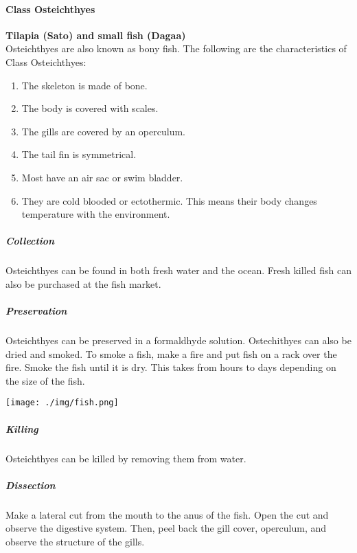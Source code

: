 \begin{multicols}{2}
\paragraph{Class Osteichthyes}

\textbf{Tilapia (Sato) and small fish (Dagaa)}\\
Osteichthyes are also known as bony fish. The following are the characteristics of Class Osteichthyes:
\begin{enumerate}
\item{The skeleton is made of bone.}
\item{The body is covered with scales.}
\item{The gills are covered by an operculum.}
\item{The tail fin is symmetrical.}
\item{Most have an air sac or swim bladder.}
\item{They are cold blooded or ectothermic. This means their body changes temperature with the environment.}
\end{enumerate}

\subparagraph{Collection}
 Osteichthyes can be found in both fresh water and the ocean. Fresh killed fish can also be purchased at the fish market.

\subparagraph{Preservation} 
Osteichthyes can be preserved in a formaldhyde solution. Ostechithyes can also be dried and smoked. 
To smoke a fish, make a fire and put fish on a rack over the fire. Smoke the fish until it is dry. This takes from hours to days depending on the size of the fish.

\begin{center}
\texttt{[image: ./img/fish.png]}
\end{center}

%

\subparagraph{Killing}
Osteichthyes can be killed by removing them from water. 

\subparagraph{Dissection}
Make a lateral cut from the mouth to the anus of the fish. Open the cut and observe the digestive system. Then, peel back the gill cover, operculum, and observe the structure of the gills.


\end{multicols}
